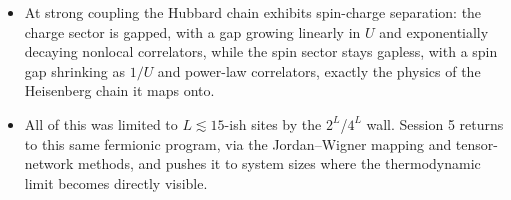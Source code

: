 \documentclass[all_sessions.tex]{subfiles}
\begin{document}
\begin{itemize}[nosep]
    are magnons, exactly matching the Heisenberg dimer of Session 2.
  \item At strong coupling the Hubbard chain exhibits spin-charge separation: the charge sector is
    gapped, with a gap growing linearly in $U$ and exponentially decaying nonlocal correlators,
    while the spin sector stays gapless, with a spin gap shrinking as $1/U$ and power-law
    correlators, exactly the physics of the Heisenberg chain it maps onto.
  \item All of this was limited to $L\lesssim 15$-ish sites by the $2^L$/$4^L$ wall. Session 5
    returns to this same fermionic program, via the Jordan--Wigner mapping and tensor-network
    methods, and pushes it to system sizes where the thermodynamic limit becomes directly visible.
\end{itemize}
\end{document}

